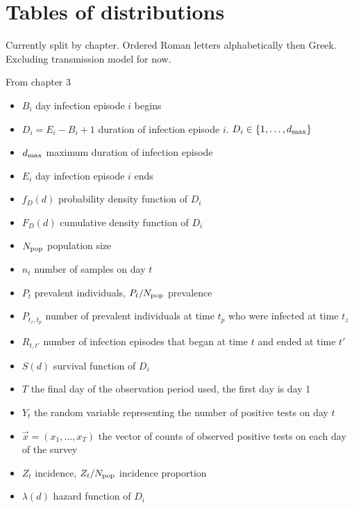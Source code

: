 \documentclass[thesis.tex]{subfiles}
\begin{document}
\chapter{Tables of distributions} \label{distributions}

Currently split by chapter.
Ordered Roman letters alphabetically then Greek.
Excluding transmission model for now.

From chapter 3

\begin{itemize}
    \item $B_i$ day infection episode $i$ begins
    \item $D_i = E_i - B_i + 1$ duration of infection episode $i$. $D_i \in \{1, \dots, d_\text{max} \}$
    \item $d_\text{max}$ maximum duration of infection episode
    \item $E_i$ day infection episode $i$ ends
    \item $f_D(d)$ probability density function of $D_i$
    \item $F_D(d)$ cumulative density function of $D_i$
    \item $N_\text{pop}$ population size
    \item $n_t$ number of samples on day $t$
    \item $P_t$ prevalent individuals, $P_t / N_\text{pop}$ prevalence
    \item $P_{t_z,t_p}$ number of prevalent individuals at time $t_p$ who were infected at time $t_z$
    \item $R_{t,t'}$ number of infection episodes that began at time $t$ and ended at time $t'$
    \item $S(d)$ survival function of $D_i$
    \item $T$ the final day of the observation period used, the first day is day 1
    \item $Y_t$ the random variable representing the number of positive tests on day $t$
    \item $\vec{x} = (x_1, \dots, x_T)$ the vector of counts of observed positive tests on each day of the survey
    \item $Z_t$ incidence, $Z_t / N_\text{pop}$ incidence proportion
    \item $\lambda(d)$ hazard function of $D_i$
\end{itemize}
\end{document}
